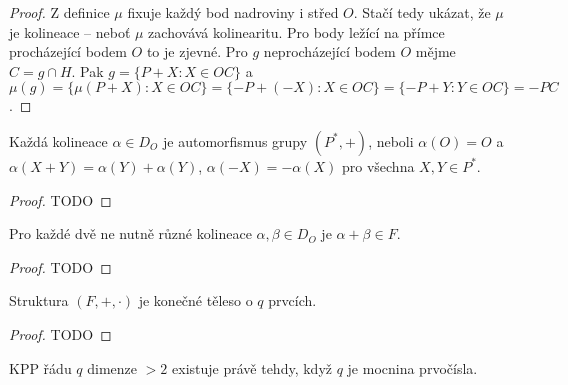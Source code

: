 \begin{proof}
    Z definice $\mu$ fixuje každý bod nadroviny i střed $O$.
    Stačí tedy ukázat, že $\mu$ je kolineace -- neboť $\mu$ zachovává kolinearitu.
    Pro body ležící na přímce procházející bodem $O$ to je zjevné.
    Pro $g$ neprocházející bodem $O$ mějme $C=g\cap H$.
    Pak $g=\{P+X: X\in OC\}$ a $\mu(g) = \{\mu(P+X): X\in OC\} = \{-P+(-X):X\in OC\}=\{-P+Y: Y\in OC\}=-PC$.
\end{proof}
\begin{lemma}
    Každá kolineace $\alpha\in D_O$ je automorfismus grupy $(P^*,+)$, neboli $\alpha(O)=O$ a $\alpha(X+Y)=\alpha(Y)+\alpha(Y)$, $\alpha(-X)=-\alpha(X)$ pro všechna $X,Y\in P^*$.
\end{lemma}
\begin{proof}
    TODO
\end{proof}
\begin{lemma}
    Pro každé dvě ne nutně různé kolineace $\alpha,\beta\in D_O$ je $\alpha+\beta\in F$.
\end{lemma}
\begin{proof}
    TODO
\end{proof}
\begin{theorem}[Veblenova]
    Struktura $(F,+,\cdot)$ je konečné těleso o $q$ prvcích.
\end{theorem}
\begin{proof}
    TODO
\end{proof}
\begin{consequence}
    KPP řádu $q$ dimenze $>2$ existuje právě tehdy, když $q$ je mocnina prvočísla.
\end{consequence}
